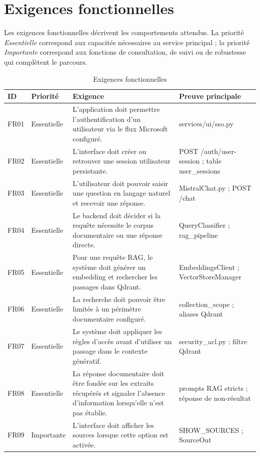 \section{Exigences fonctionnelles}

Les exigences fonctionnelles décrivent les comportements attendus. La priorité \textit{Essentielle} correspond aux capacités nécessaires au service principal ; la priorité \textit{Importante} correspond aux fonctions de consultation, de suivi ou de robustesse qui complètent le parcours.

\begin{table}[H]
\centering
\caption{Exigences fonctionnelles}
\label{tab:functional_ch4}
\begin{tabular}{p{1.2cm}p{2cm}p{7.1cm}p{3.4cm}}
\toprule
\textbf{ID} & \textbf{Priorité} & \textbf{Exigence} & \textbf{Preuve principale} \\
\midrule
FR01 & Essentielle & L'application doit permettre l'authentification d'un utilisateur via le flux Microsoft configuré. & services/ui/sso.py \\
FR02 & Essentielle & L'interface doit créer ou retrouver une session utilisateur persistante. & POST /auth/user-session ; table user\_sessions \\
FR03 & Essentielle & L'utilisateur doit pouvoir saisir une question en langage naturel et recevoir une réponse. & MistralChat.py ; POST /chat \\
FR04 & Essentielle & Le backend doit décider si la requête nécessite le corpus documentaire ou une réponse directe. & QueryClassifier ; rag\_pipeline \\
FR05 & Essentielle & Pour une requête RAG, le système doit générer un embedding et rechercher les passages dans Qdrant. & EmbeddingsClient ; VectorStoreManager \\
FR06 & Essentielle & La recherche doit pouvoir être limitée à un périmètre documentaire configuré. & collection\_scope ; aliases Qdrant \\
FR07 & Essentielle & Le système doit appliquer les règles d'accès avant d'utiliser un passage dans le contexte génératif. & security\_acl.py ; filtre Qdrant \\
FR08 & Essentielle & La réponse documentaire doit être fondée sur les extraits récupérés et signaler l'absence d'information lorsqu'elle n'est pas établie. & prompts RAG stricts ; réponse de non-résultat \\
FR09 & Importante & L'interface doit afficher les sources lorsque cette option est activée. & SHOW\_SOURCES ; SourceOut \\

\end{tabular}
\end{table}
